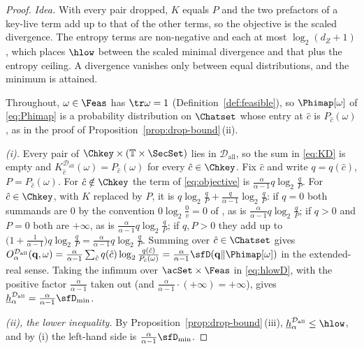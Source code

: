 \begin{proof}
\emph{Idea.} With every pair dropped, $K$ equals $P$ and the two prefactors
of a key-live term add up to that of the other terms, so the objective is
the scaled divergence. The entropy terms are non-negative and each at most
$\log_2(d_Z+1)$, which places $\hlow$ between the scaled minimal divergence
and that plus the entropy ceiling. A divergence vanishes only between equal
distributions, and the minimum is attained.

Throughout, $\omega\in\Feas$ has $\tr\omega=1$ (Definition~\ref{def:feasible}),
so $\Phimap[\omega]$ of \eqref{eq:Phimap} is a probability distribution on
$\Chatset$ whose entry at $\hat c$ is $P_{\hat c}(\omega)$, as in the proof of
Proposition~\ref{prop:drop-bound}\,(ii).

\emph{(i).} Every pair of $\Chkey\times(\mathbb{T}\times\SecSet)$ lies in
$\mathcal{D}_{\mathrm{all}}$, so the sum in \eqref{eq:KD} is empty and
$K^{\mathcal{D}_{\mathrm{all}}}_{\hat c}(\omega)=P_{\hat c}(\omega)$ for every
$\hat c\in\Chkey$. Fix $\hat c$ and write $q=q(\hat c)$, $P=P_{\hat c}(\omega)$.
For $\hat c\notin\Chkey$ the term of \eqref{eq:objective} is
$\frac{\alpha}{\alpha-1}q\log_2\frac qP$. For $\hat c\in\Chkey$, with $K$
replaced by $P$, it is $q\log_2\frac qP+\frac{q}{\alpha-1}\log_2\frac qP$:
if $q=0$ both summands are $0$ by the convention
$0\log_2\frac0v=0$ of , as is
$\frac{\alpha}{\alpha-1}q\log_2\frac qP$; if $q>0$ and $P=0$ both are
$+\infty$, as is $\frac{\alpha}{\alpha-1}q\log_2\frac qP$; if $q,P>0$ they
add up to $\big(1+\frac{1}{\alpha-1}\big)q\log_2\frac qP
=\frac{\alpha}{\alpha-1}q\log_2\frac qP$. Summing over $\hat c\in\Chatset$
gives $O^{\mathcal{D}_{\mathrm{all}}}_{\alpha}(\mathbf q,\omega)
=\frac{\alpha}{\alpha-1}\sum_{\hat c}q(\hat c)\log_2
\frac{q(\hat c)}{P_{\hat c}(\omega)}
=\frac{\alpha}{\alpha-1}\sfD(\mathbf q\|\Phimap[\omega])$ in the extended-real
sense. Taking the infimum over $\acSet\times\Feas$ in \eqref{eq:hlowD}, with
the positive factor $\frac{\alpha}{\alpha-1}$ taken out (and
$\frac{\alpha}{\alpha-1}\cdot(+\infty)=+\infty$), gives
$\underline{h}^{\mathcal{D}_{\mathrm{all}}}_{\alpha}
=\frac{\alpha}{\alpha-1}\sfD_{\min}$.

\emph{(ii), the lower inequality.} By
Proposition~\ref{prop:drop-bound}\,(iii),
$\underline{h}^{\mathcal{D}_{\mathrm{all}}}_{\alpha}\le\hlow$, and by (i) the
left-hand side is $\frac{\alpha}{\alpha-1}\sfD_{\min}$.


\end{proof}
